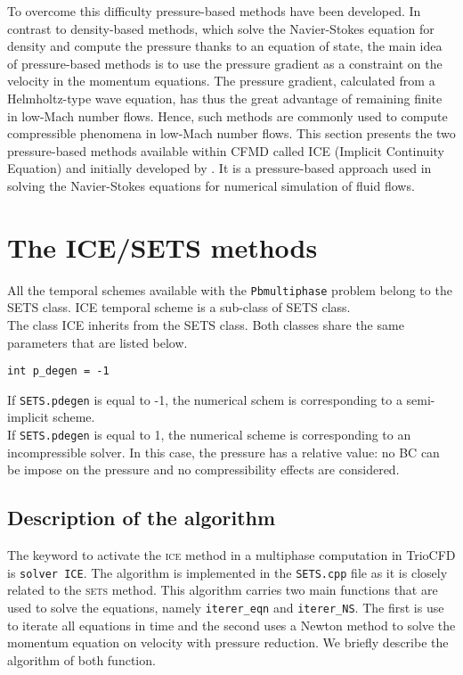 To overcome this difficulty pressure-based methods have been developed. In contrast to density-based methods, which solve the Navier-Stokes equation for density and compute the pressure thanks to an equation of state, the main idea of pressure-based methods is to use the pressure gradient as a constraint on the velocity in the momentum equations. The pressure gradient, calculated from a Helmholtz-type wave equation, has thus the great advantage of remaining finite in low-Mach number flows. Hence, such methods are commonly used to compute compressible phenomena in low-Mach number flows. 
This section presents the two pressure-based methods available within CFMD called ICE (Implicit Continuity Equation) and initially developed by \cite{harlow1968numerical,harlow1971numerical}. It is a pressure-based approach used in solving the Navier-Stokes equations for numerical simulation of fluid flows. 

\section{The ICE/SETS methods} \label{time:ice}
All the temporal schemes available with the \texttt{Pb\textunderscore multiphase} problem belong to the SETS class. ICE temporal scheme is a sub-class of SETS class.\\ The class ICE inherits from the SETS class. Both classes share the same parameters that are listed below.
\begin{lstlisting}
int p_degen = -1
\end{lstlisting}
If \texttt{SETS.p\textunderscore degen} is equal to -1, the numerical schem is corresponding to a semi-implicit scheme.\\ If \texttt{SETS.p\textunderscore degen} is equal to 1, the numerical scheme is corresponding to an incompressible solver. In this case, the pressure has a relative value: no BC can be impose on the pressure and no compressibility effects are considered.

\subsection{Description of the algorithm}
The keyword to activate the \textsc{ice} method in a multiphase computation in TrioCFD is \lstinline{solver ICE}. The algorithm is implemented in the \texttt{SETS.cpp} file as it is closely related to the \textsc{sets} method. This algorithm carries two main functions that are used to solve the equations, namely \texttt{iterer_eqn} and \texttt{iterer_NS}. The first is use to iterate all equations in time and the second uses a Newton method to solve the momentum equation on velocity with pressure reduction. We briefly describe the algorithm of both function.
